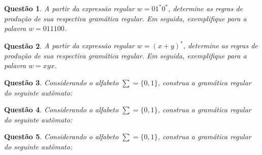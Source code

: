\documentclass{article}
\newtheorem{problem}{Questão}
\begin{document}
        \begin{problem}
           A partir da expressão regular $w = 01^{*}0^{*}$, determine as regras de produção de sua respectiva gramática regular. Em seguida, exemplifique para a palavra $w = 011100$.
        \end{problem}
        \begin{solution}
        
    \end{solution}
        \begin{problem}
           A partir da expressão regular $w = (x+y)^{*}$, determine as regras de produção de sua respectiva gramática regular. Em seguida, exemplifique para a palavra $w = xyx$.
        \end{problem}
        \begin{solution}
        
    \end{solution}
        \begin{problem}
        Considerando o alfabeto $\sum = \{ 0, 1\}$, construa a gramática regular do seguinte autômato:
    
        
        \end{problem}
        \begin{solution}
        
    \end{solution}
         \begin{problem}
        Considerando o alfabeto $\sum = \{ 0, 1\}$, construa a gramática regular do seguinte autômato:
        
        
        \end{problem}
        \begin{solution}
        
    \end{solution}
         \begin{problem}
        Considerando o alfabeto $\sum = \{ 0, 1\}$, construa a gramática regular do seguinte autômato:
        
        
        \end{problem}
    \begin{solution}
      
    \end{solution}
    
\end{document}

